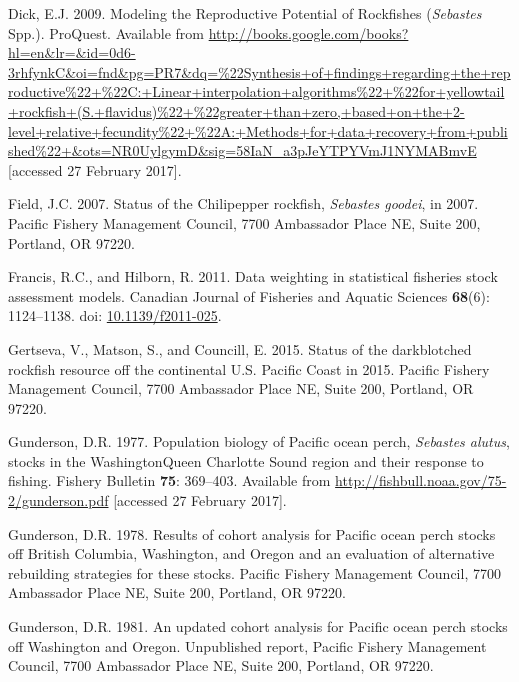 \documentclass[12pt,]{article}
\begin{document}
\hypertarget{ref-dick_modeling_2009}{}
Dick, E.J. 2009. Modeling the Reproductive Potential of Rockfishes
(\emph{Sebastes} Spp.). ProQuest. Available from
\url{http://books.google.com/books?hl=en\&lr=\&id=0d6-3rhfynkC\&oi=fnd\&pg=PR7\&dq=\%22Synthesis+of+findings+regarding+the+reproductive\%22+\%22C:+Linear+interpolation+algorithms\%22+\%22for+yellowtail+rockfish+(S.+flavidus)\%22+\%22greater+than+zero,+based+on+the+2-level+relative+fecundity\%22+\%22A:+Methods+for+data+recovery+from+published\%22+\&ots=NR0UylgymD\&sig=58IaN_a3pJeYTPYVmJ1NYMABmvE}
{[}accessed 27 February 2017{]}.

\hypertarget{ref-field_status_2007}{}
Field, J.C. 2007. Status of the Chilipepper rockfish, \emph{Sebastes
goodei}, in 2007. Pacific Fishery Management Council, 7700 Ambassador
Place NE, Suite 200, Portland, OR 97220.

\hypertarget{ref-francis_data_2011}{}
Francis, R.C., and Hilborn, R. 2011. Data weighting in statistical
fisheries stock assessment models. Canadian Journal of Fisheries and
Aquatic Sciences \textbf{68}(6): 1124--1138. doi:
\href{https://doi.org/10.1139/f2011-025}{10.1139/f2011-025}.

\hypertarget{ref-gertseva_status_2015}{}
Gertseva, V., Matson, S., and Councill, E. 2015. Status of the
darkblotched rockfish resource off the continental U.S. Pacific Coast in
2015. Pacific Fishery Management Council, 7700 Ambassador Place NE,
Suite 200, Portland, OR 97220.

\hypertarget{ref-gunderson_population_1977}{}
Gunderson, D.R. 1977. Population biology of Pacific ocean perch,
\emph{Sebastes alutus}, stocks in the WashingtonQueen Charlotte Sound
region and their response to fishing. Fishery Bulletin \textbf{75}:
369--403. Available from
\url{http://fishbull.noaa.gov/75-2/gunderson.pdf} {[}accessed 27
February 2017{]}.

\hypertarget{ref-gunderson_results_1978}{}
Gunderson, D.R. 1978. Results of cohort analysis for Pacific ocean perch
stocks off British Columbia, Washington, and Oregon and an evaluation of
alternative rebuilding strategies for these stocks. Pacific Fishery
Management Council, 7700 Ambassador Place NE, Suite 200, Portland, OR
97220.

\hypertarget{ref-gunderson_updated_1981}{}
Gunderson, D.R. 1981. An updated cohort analysis for Pacific ocean perch
stocks off Washington and Oregon. Unpublished report, Pacific Fishery
Management Council, 7700 Ambassador Place NE, Suite 200, Portland, OR
97220.
\end{document}
